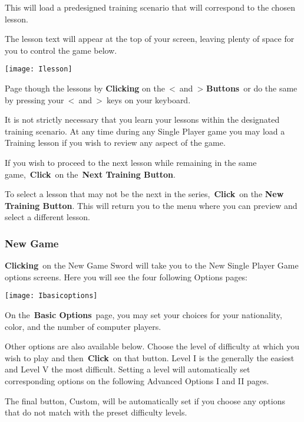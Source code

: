 This will load a predesigned training scenario that will correspond to the chosen lesson.

The lesson text will appear at the top of your screen, leaving plenty of space for you to control the game below.

\begin{center}
\texttt{[image: Ilesson]}
\end{center}

Page though the lessons by \textbf{Clicking} on the \textless and \textgreater \hspace{1pt} \textbf{Buttons} or do the same by pressing your \textless and \textgreater keys on your keyboard.

It is not strictly necessary that you learn your lessons within the designated training scenario. At any time during any Single Player game you may load a Training lesson if you wish to review any aspect of the game.

If you wish to proceed to the next lesson while remaining in the same game, \textbf{Click} on the \textbf{Next Training Button}.

To select a lesson that may not be the next in the series, \textbf{Click} on the \textbf{New Training Button}. This will return you to the menu where you can preview and select a different lesson.

\subsubsection{New Game}

\textbf{Clicking} on the New Game Sword will take you to the New Single Player Game options screens. Here you will see the four following Options pages:

\begin{center}
	\texttt{[image: Ibasicoptions]}
\end{center}

On the \textbf{Basic Options} page, you may set your choices for your nationality, color, and the number of computer players.

Other options are also available below. Choose the level of difficulty at which you wish to play and then \textbf{Click} on that button. Level I is the generally the easiest and Level V the most difficult. Setting a level will automatically set corresponding options on the following Advanced Options I and II pages.

The final button, Custom, will be automatically set if you choose any options that do not match with the preset difficulty levels.

